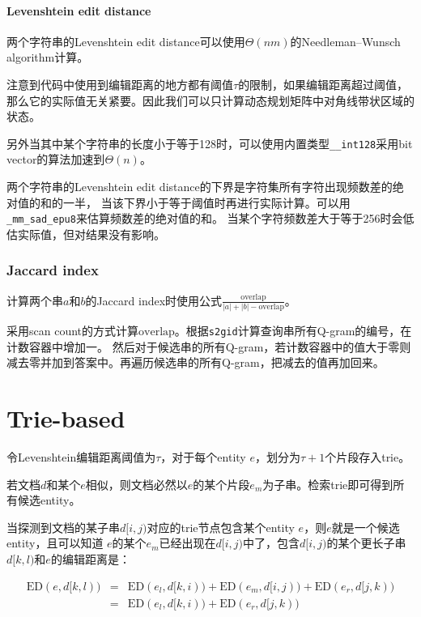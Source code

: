 \paragraph{Levenshtein edit distance}

两个字符串的Levenshtein edit distance可以使用$\Theta(nm)$的Needleman–Wunsch algorithm计算。

注意到代码中使用到编辑距离的地方都有阈值$\tau$的限制，如果编辑距离超过阈值，那么它的实际值无关紧要。因此我们可以只计算动态规划矩阵中对角线带状区域的状态。

另外当其中某个字符串的长度小于等于128时，可以使用内置类型\texttt{\_\_int128}采用bit vector的算法\cite{edit03}加速到$\Theta(n) $。

两个字符串的Levenshtein edit distance的下界是字符集所有字符出现频数差的绝对值的和的一半，
当该下界小于等于阈值时再进行实际计算。可以用\texttt{\_mm\_sad\_epu8}来估算频数差的绝对值的和。
当某个字符频数差大于等于256时会低估实际值，但对结果没有影响。

\subsubsection{Jaccard index}

计算两个串$a$和$b$的Jaccard index时使用公式$\frac{\mathrm{overlap}}{|a|+|b|-\mathrm{overlap}}$。

采用scan count的方式计算$\mathrm{overlap}$。根据\texttt{s2gid}计算查询串所有Q-gram的编号，在计数容器中增加一。
然后对于候选串的所有Q-gram，若计数容器中的值大于零则减去零并加到答案中。再遍历候选串的所有Q-gram，把减去的值再加回来。

\section{Trie-based\cite{taste}}

令Levenshtein编辑距离阈值为$\tau$，对于每个entity $e$，划分为$\tau+1$个片段存入trie。

若文档$d$和某个$e$相似，则文档必然以$e$的某个片段$e_m$为子串。检索trie即可得到所有候选entity。

当探测到文档的某子串$d[i,j)$对应的trie节点包含某个entity $e$，则$e$就是一个候选entity，且可以知道
$e$的某个$e_m$已经出现在$d[i,j)$中了，包含$d[i,j)$的某个更长子串$d[k,l)$和$e$的编辑距离是：

\begin{eqnarray*}
\text{ED}(e,d[k,l)) &=& \text{ED}(e_l,d[k,i)) + \text{ED}(e_m,d[i,j)) + \text{ED}(e_r,d[j,k)) \\
&=& \text{ED}(e_l,d[k,i)) + \text{ED}(e_r,d[j,k))
\end{eqnarray*}

